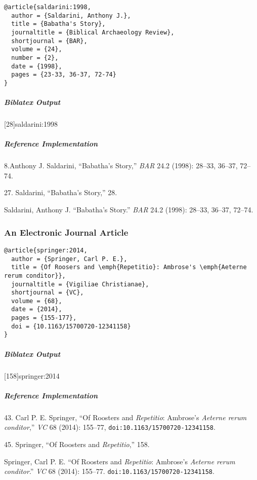 \documentclass[a4paper]{article}
\newenvironment{biboutput}{%
  \subparagraph{Biblatex Output}
}{\color{black}}
\newenvironment{refimp}{%
  \subparagraph{Reference Implementation}
  \color{reference-colour}
  \rm
}{\par\color{black}}
\begin{document}
\begin{lstlisting}
@article{saldarini:1998,
  author = {Saldarini, Anthony J.},
  title = {Babatha's Story},
  journaltitle = {Biblical Archaeology Review},
  shortjournal = {BAR},
  volume = {24},
  number = {2},
  date = {1998},
  pages = {23-33, 36-37, 72-74}
}
\end{lstlisting}  

\begin{biboutput}
  [28]{saldarini:1998}
\end{biboutput}

\begin{refimp}
  8.Anthony J. Saldarini, “Babatha’s Story,” \emph{BAR} 24.2 (1998): 28–33,
  36–37, 72–74.

  27. Saldarini, “Babatha’s Story,” 28.

 \hangindent\bibindent Saldarini, Anthony J. “Babatha’s Story.” \emph{BAR}
 24.2 (1998): 28–33, 36–37, 72–74.

\end{refimp}

\subsubsection{An Electronic Journal Article}

\begin{lstlisting}
@article{springer:2014,
  author = {Springer, Carl P. E.},
  title = {Of Roosers and \emph{Repetitio}: Ambrose's \emph{Aeterne rerum conditor}},
  journaltitle = {Vigiliae Christianae},
  shortjournal = {VC},
  volume = {68},
  date = {2014},
  pages = {155-177},
  doi = {10.1163/15700720-12341158}
}
\end{lstlisting}

\begin{biboutput}
  [158]{springer:2014}
\end{biboutput}

\begin{refimp}
  43. Carl P. E. Springer, “Of Roosters and \emph{Repetitio}: Ambrose’s
  \emph{Aeterne rerum conditor},” \emph{VC} 68 (2014): 155–77,
  \nolinkurl{doi:10.1163/15700720-12341158}.

  45. Springer, “Of Roosters and \emph{Repetitio},” 158.

  \hangindent\bibindent Springer, Carl P. E. “Of Roosters and
  \emph{Repetitio}: Ambrose’s \emph{Aeterne rerum conditor}.” \emph{VC} 68
  (2014): 155–77. \nolinkurl{doi:10.1163/15700720-12341158}.

\end{refimp}
\end{document}
